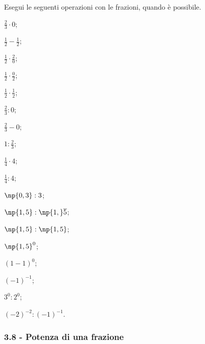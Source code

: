 \begin{esercizio}
 \label{ese:3.60}
Esegui le seguenti operazioni con le frazioni, quando è possibile.
\begin{multicols}{3}
\begin{enumeratea}
\spazielenx
\item $\displaystyle{\frac{2}{3}\cdot0}$;
\item $\displaystyle{\frac{1}{2}-\frac{1}{2}}$;
\item $\displaystyle{\frac{1}{2}\cdot\frac{2}{0}}$;
\item $\displaystyle{\frac{1}{2}}\cdot\frac{0}{2}$;
\item $\displaystyle{\frac{1}{2}\cdot\frac{1}{2}}$;
\item $\displaystyle{\frac{2}{3}:0}$;
\item $\displaystyle{\frac{2}{3}-0}$;
\item $\displaystyle{1:\frac{2}{3}}$;
\item $\displaystyle{\frac{1}{4}\cdot4}$;
\item $\displaystyle{\frac{1}{4}:4}$;
\item $\np{0,3}:3$;
\item $\displaystyle{\np{1,5}:\np{1,}\overline{5}}$;
\item $\np{1,5}:\np{1,5}$;
\item $\np{1,5}^0$;
\item $(1-1)^0$;
\item $(-1)^{-1}$;
\item $3^0:2^0$;
\item $(-2)^{-2}:(-1)^{-1}$.
\end{enumeratea}
\end{multicols}
\end{esercizio}

\subsubsection*{3.8 - Potenza di una frazione}

